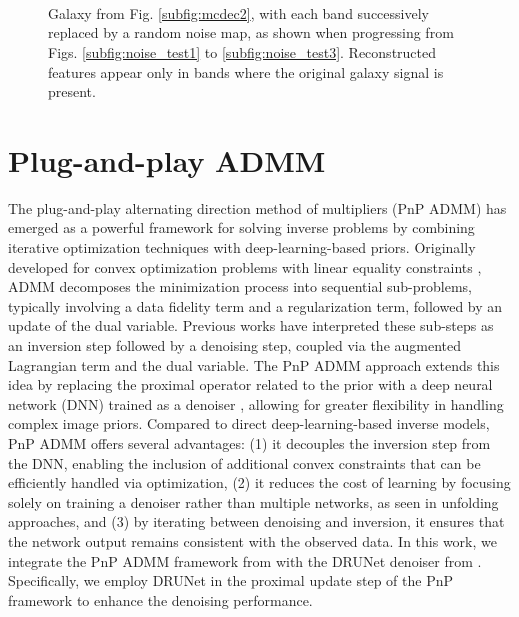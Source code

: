 \documentclass[traditabstract]{aa}
\begin{document}
\begin{appendix}
\begin{figure}[h!]
    \centering

    \\

    \\

    \\
    
    \caption{Galaxy from Fig. \ref{subfig:mcdec2}, with each band successively replaced by a random noise map, as shown when progressing from Figs. \ref{subfig:noise_test1} to \ref{subfig:noise_test3}. Reconstructed features appear only in bands where the original galaxy signal is present.}
    \label{fig:noise_test}
\end{figure}


\section{Plug-and-play ADMM}
\label{sec:pnp_admm}

The plug-and-play alternating direction method of multipliers (PnP ADMM) has emerged as a powerful framework for solving inverse problems by combining iterative optimization techniques with deep-learning-based priors. Originally developed for convex optimization problems with linear equality constraints \citep{Boyd2010}, ADMM decomposes the minimization process into sequential sub-problems, typically involving a data fidelity term and a regularization term, followed by an update of the dual variable. Previous works \citep{Venkatakrishnan2013, Sreehari2016, Chan2016} have interpreted these sub-steps as an inversion step followed by a denoising step, coupled via the augmented Lagrangian term and the dual variable. The PnP ADMM  approach extends this idea by replacing the proximal operator related to the prior with a deep neural network (DNN) trained as a denoiser \citep{Meinhardt2017, Bigdeli2017, Gupta2018, sureau2020}, allowing for greater flexibility in handling complex image priors. Compared to direct deep-learning-based inverse models, PnP ADMM offers several advantages: (1) it decouples the inversion step from the DNN, enabling the inclusion of additional convex constraints that can be efficiently handled via optimization, (2) it reduces the cost of learning by focusing solely on training a denoiser rather than multiple networks, as seen in unfolding approaches, and (3) by iterating between denoising and inversion, it ensures that the network output remains consistent with the observed data. In this work, we integrate the PnP ADMM framework from \cite{sureau2020} with the DRUNet denoiser from \cite{drunet}. Specifically, we employ DRUNet in the proximal update step of the PnP framework to enhance the denoising performance. 


\end{appendix}
\end{document}
